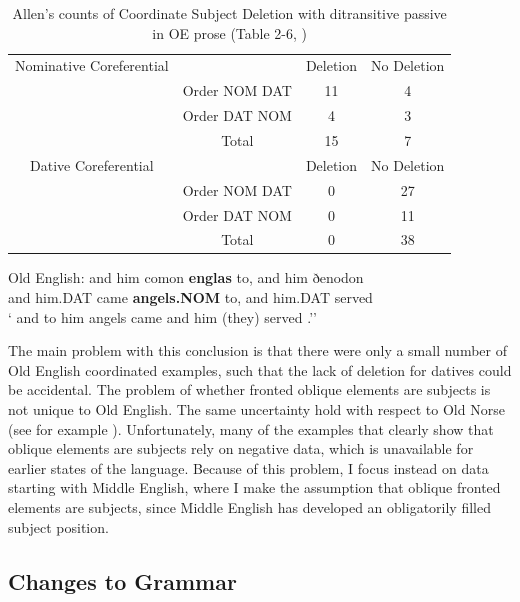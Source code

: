 	\begin{table}[t]
		\begin{tabular}{cccc}
			Nominative Coreferential & & Deletion & No Deletion \\
			& Order NOM DAT & 11 & 4 \\
			& Order DAT NOM & 4 & 3 \\
			& Total & 15 & 7 \\
			\hline
			Dative Coreferential & & Deletion & No Deletion \\
			& Order NOM DAT & 0 & 27 \\
			& Order DAT NOM & 0 & 11 \\
			& Total & 0 & 38 \\
		\end{tabular}
		\caption{Allen's counts of Coordinate Subject Deletion with ditransitive passive in OE prose (Table 2-6, \citealt{Allen.1999})}
		\label{tab:AllenOECSD}
	\end{table}

	\begin{exe}
		\ex \label{ex:OECSD} Old English:
		\gll and him comon \textbf{englas} to, and him ðenodon\\
		and him.DAT came \textbf{angels.NOM} to, and him.DAT served\\
		\trans ` and to him angels came and him (they) served \citep[ex. 34]{Allen.1999}.''
	\end{exe}

	The main problem with this conclusion is that there were only a small number of Old English coordinated examples, such that the lack of deletion for datives could be accidental. The problem of whether fronted oblique elements are subjects is not unique to Old English. The same uncertainty hold with respect to Old Norse (see for example \citealt{Kristoffersen.1991,Kristoffersen.1994,Bardal.2001b}). Unfortunately, many of the examples that clearly show that oblique elements are subjects rely on negative data, which is unavailable for earlier states of the language. Because of this problem, I focus instead on data starting with Middle English, where I make the assumption that oblique fronted elements are subjects, since Middle English has developed an obligatorily filled subject position.

	\subsection{Changes to Grammar}


